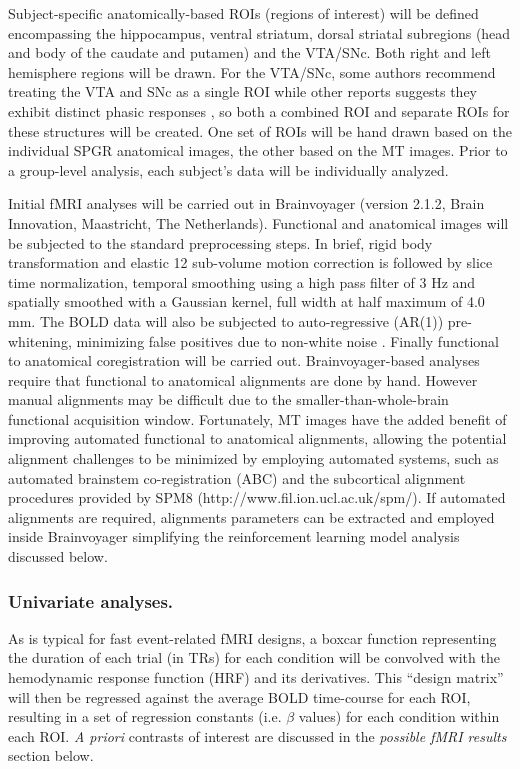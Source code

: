 \documentclass[doc]{apa}        %
\begin{document}
Subject-specific anatomically-based ROIs (regions of interest) will be defined encompassing the hippocampus, ventral striatum, dorsal striatal subregions (head and body of the caudate and putamen) and the VTA/SNc.  Both right and left hemisphere regions will be drawn.  For the VTA/SNc, some authors recommend treating the VTA and SNc as a single ROI while other reports suggests they exhibit distinct phasic responses \cite{GuitartMasip:2010p7227,Matsumoto:2009p7219}, so both a combined ROI and separate ROIs for these structures will be created.  One set of ROIs will be hand drawn based on the individual SPGR anatomical images, the other based on the MT images.  Prior to a group-level analysis, each subject's data will be individually analyzed.

Initial fMRI analyses will be carried out in Brainvoyager (version 2.1.2, Brain Innovation, Maastricht, The Netherlands). Functional and anatomical images will be subjected to the standard preprocessing steps. In brief, rigid body transformation and elastic 12 sub-volume motion correction is followed by slice time normalization, temporal smoothing using a high pass filter of 3 Hz and spatially smoothed with a Gaussian kernel, full width at half maximum of 4.0 mm.  The BOLD data will also be subjected to auto-regressive (AR(1)) pre-whitening, minimizing false positives due to non-white noise \cite{Smith:2007p6568}.  Finally functional to anatomical coregistration will be carried out.  Brainvoyager-based analyses require that functional to anatomical alignments are done by hand.  However manual alignments may be difficult due to the smaller-than-whole-brain functional acquisition window. Fortunately, MT images have the added benefit of improving automated functional to anatomical alignments, allowing the potential alignment challenges to be minimized by employing automated systems, such as automated brainstem co-registration (ABC) \cite{Napadow:2006p6933} and the subcortical alignment procedures provided by SPM8 (http://www.fil.ion.ucl.ac.uk/spm/).  If automated alignments are required, alignments parameters can be extracted and employed inside Brainvoyager simplifying the reinforcement learning model analysis discussed below. 

\subsubsection{Univariate analyses.}
As is typical for fast event-related fMRI designs, a boxcar function representing the duration of each trial (in TRs) for each condition will be convolved with the hemodynamic response function (HRF) and its derivatives.  This ``design matrix'' will then be regressed against the average BOLD time-course for each ROI, resulting in a set of regression constants (i.e. $\beta$ values) for each condition within each ROI.  \emph{A priori} contrasts of interest are discussed in the \emph{possible fMRI results} section below.
\end{document}
